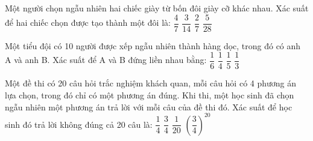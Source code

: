 \begin{ex}
Một người chọn ngẫu nhiên hai chiếc giày từ bốn đôi giày cỡ khác nhau. Xác suất để hai chiếc chọn được tạo thành một đôi là:
\choice
{$\dfrac{4}{7}$}
{$\dfrac{3}{14}$}
{\True $\dfrac{2}{7}$}
{$\dfrac{5}{28}$}
\end{ex}
\begin{ex}
Một tiểu đội có 10 người được xếp ngẫu nhiên thành hàng dọc, trong đó có anh A và anh B. Xác suất để A và B đứng liền nhau bằng:
\choice
{$\dfrac{1}{6}$}
{$\dfrac{1}{4}$}
{\True $\dfrac{1}{5}$}
{$\dfrac{1}{3}$}
\end{ex}
\begin{ex}
Một đề thi có 20 câu hỏi trắc nghiệm khách quan, mỗi câu hỏi có 4 phương án lựa chọn, trong đó chỉ có một phương án đúng. Khi thi, một học sinh đã chọn ngẫu nhiên một phương án trả lời với mỗi câu của đề thi đó. Xác suất để học sinh đó trả lời không đúng cả 20 câu là:
\choice
{$\dfrac{1}{4}$}
{$\dfrac{3}{4}$}
{$\dfrac{1}{20}$}
{\True $\left(\dfrac{3}{4}\right)^20$}
\end{ex}
